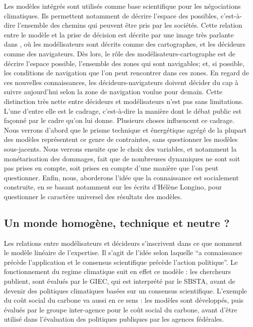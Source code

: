Les modèles intégrés sont utilisés comme base scientifique pour les négociations climatiques. Ils permettent notamment de décrire l'espace des possibles, c'est-à-dire l'ensemble des chemins qui peuvent être pris par les sociétés. Cette relation entre le modèle et la prise de décision est décrite par une image très parlante dans \textcite{edenhofer_mapmakers_2014}, où les modélisateurs sont décrits comme des cartographes, et les décideurs comme des navigateurs. Dès lors, le rôle des modélisateurs-cartographe est de décrire l'espace possible, l'ensemble des zones qui sont navigables; et, si possible, les conditions de navigation que l'on peut rencontrer dans ces zones.  En regard de ces nouvelles connaissances, les décideurs-navigateurs doivent décider du cap à suivre aujourd'hui selon la zone de navigation voulue pour demain. Cette distinction très nette entre décideurs et modélisateurs n'est pas sans limitations. L'une d'entre elle est le cadrage, c'est-à-dire la manière dont le débat public est façonné par le cadre qu'on lui donne.  Plusieurs choses influencent ce cadrage. Nous verrons d'abord que le prisme technique et énergétique agrégé de la plupart des modèles représentent ce genre de contraintes, sans questionner les modèles sous-jacents. Nous verrons ensuite que le choix des variables, et notamment la monétarisation des dommages, fait que de nombreuses dynamiques ne sont soit pas prises en compte, soit prises en compte d'une manière que l'on peut questionner. Enfin, nous, aborderons l'idée que la connaissance est socialement construite, en se basant notamment sur les écrits d'Hélène Longino, pour questionner le caractère universel des résultats des modèles. 

\subsection{Un monde homogène, technique et neutre ?}
\label{ss:model-lineaire}

Les relations entre modélisateurs et décideurs s'inscrivent dans ce que \textcite{aykut_gouverner_nodate} nomment le modèle linéaire de l'expertise. Il s'agit de l'idée selon laquelle \enquote{a connaissance précède l’application et le consensus scientifique précède l’action politique}. Le fonctionnement du \gls{regime climatique} suit en effet ce modèle : les chercheurs publient, sont évalués par le GIEC, qui est interprété par le SBSTA, avant de devenir des politiques climatiques basées sur un consensus scientifique. L'exemple du coût social du carbone va aussi en ce sens : les modèles sont développés, puis évalués par le groupe inter-agence pour le coût social du carbone, avant d'être utilisé dans l'évaluation des politiques publiques par les agences fédérales. 

